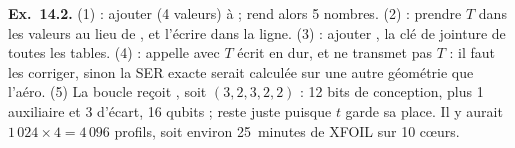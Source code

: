 \textbf{Ex.~14.2.} (1)  : ajouter  (4 valeurs) à  ;  rend alors 5 nombres. (2)  : prendre $T$ dans les valeurs au lieu de , et l'écrire dans la ligne. (3)  : ajouter , la clé de jointure de toutes les tables. (4)  :  appelle  avec $T$ écrit en dur, et  ne transmet pas $T$ : il faut les corriger, sinon la SER exacte serait calculée sur une autre géométrie que l'aéro. (5) La boucle reçoit , soit $(3,2,3,2,2)$ : 12 bits de conception, plus 1 auxiliaire et 3 d'écart, 16 qubits ;  reste juste puisque $t$ garde sa place. Il y aurait $1\,024\times4=4\,096$ profils, soit environ 25~minutes de XFOIL sur 10 cœurs.
